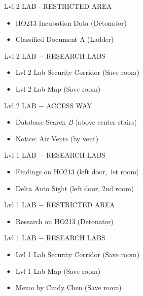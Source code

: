 \begin{subregion}{Lvl 2 LAB - RESTRICTED AREA}
    \begin{itemize}
        \item HO213 Incubation Data (Detonator)
        \item Classified Document A (Ladder)
    \end{itemize}
\end{subregion}

\begin{subregion}{Lvl 2 LAB $\boldsymbol{-}$ RESEARCH LABS}
    \begin{itemize}
        \item Lvl 2 Lab Security Corridor (Save room)
        \item Lvl 2 Lab Map (Save room)
    \end{itemize}
\end{subregion}

\begin{subregion}{Lvl 2 LAB $\boldsymbol{-}$ ACCESS WAY}
    \begin{itemize}
        \item Database Search \emph{B} (above center stairs)
        \item Notice: Air Vents (by vent)
    \end{itemize}
\end{subregion}

\begin{subregion}{Lvl 1 LAB $\boldsymbol{-}$ RESEARCH LABS}
    \begin{itemize}
        \item Findings on HO213 (left door, 1st room)
        \item Delta Auto Sight (left door, 2nd room)
    \end{itemize}
\end{subregion}

\begin{subregion}{Lvl 1 LAB $\boldsymbol{-}$ RESTRICTED AREA}
    \begin{itemize}
        \item Research on HO213 (Detonator)
    \end{itemize}
\end{subregion}

\begin{subregion}{Lvl 1 LAB $\boldsymbol{-}$ RESEARCH LABS}
    \begin{itemize}
        \item Lvl 1 Lab Security Corridor (Save room)
        \item Lvl 1 Lab Map (Save room)
        \item Memo by Cindy Chen (Save room)
    \end{itemize}
\end{subregion}
